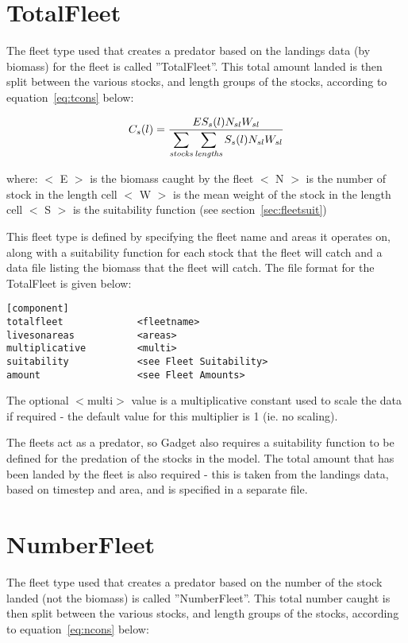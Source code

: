 \documentclass[10pt,twoside]{book}
\begin{document}
\section{TotalFleet}\label{sec:totalfleet}
The fleet type used that creates a predator based on the landings data (by biomass) for the fleet is called ''TotalFleet''.  This total amount landed is then split between the various stocks, and length groups of the stocks, according to equation~\ref{eq:tcons} below:

\begin{equation}\label{eq:tcons}
C_{s}(l) = \frac{E S_{s}(l) N_{sl} W_{sl}}{\displaystyle \sum_{\it stocks} \sum_{\it lengths} S_{s}(l) N_{sl} W_{sl}}
\end{equation}

where:\newline
$<$ E $>$ is the biomass caught by the fleet\newline
$<$ N $>$ is the number of stock in the length cell\newline
$<$ W $>$ is the mean weight of the stock in the length cell\newline
$<$ S $>$ is the suitability function (see section~\ref{sec:fleetsuit})

\bigskip
This fleet type is defined by specifying the fleet name and areas it operates on, along with a suitability function for each stock that the fleet will catch and a data file listing the biomass that the fleet will catch.  The file format for the TotalFleet is given below:

{\small\begin{verbatim}
[component]
totalfleet             <fleetname>
livesonareas           <areas>
multiplicative         <multi>
suitability            <see Fleet Suitability>
amount                 <see Fleet Amounts>
\end{verbatim}}

The optional $<$multi$>$ value is a multiplicative constant used to scale the data if required - the default value for this multiplier is 1 (ie. no scaling).

\bigskip
The fleets act as a predator, so Gadget also requires a suitability function to be defined for the predation of the stocks in the model.  The total amount that has been landed by the fleet is also required - this is taken from the landings data, based on timestep and area, and is specified in a separate file.

\section{NumberFleet}\label{sec:numberfleet}
The fleet type used that creates a predator based on the number of the stock landed (not the biomass) is called ''NumberFleet''.  This total number caught is then split between the various stocks, and length groups of the stocks, according to equation~\ref{eq:ncons} below:
\end{document}
